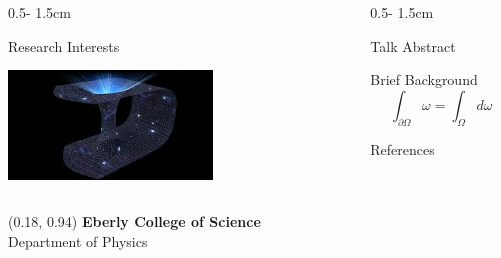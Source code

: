 \documentclass{psuposter}
\begin{document}
\begin{frame}
\begin{columns}[onlytextwidth]
\begin{column}{0.5\textwidth - 1.5cm}
    \begin{block}{Research Interests}
        \lipsum[2]
        \begin{center}
	    	\includegraphics[width=0.6\textwidth]{psuposter-images/sample-research}    		
    	\end{center}
    \end{block}
\end{column}


\begin{column}{0.5\textwidth - 1.5cm}
    \begin{block}{Talk Abstract}
        \lipsum[4]
    \end{block}

    \begin{block}{Brief Background}
        \lipsum[2]
        \cite{ashtekarLoopQuantumGravity2017}
        $$\int_{\partial \Omega} \omega = \int_{\Omega} d \omega$$
        \lipsum[2]
        \cite{anselmiPredictionsQuantumGravity2020}
    \end{block}

    \begin{block}{References}
        
		
    \end{block}

\end{column}


\end{columns}


\begin{textblock}{0.5}(0.18, 0.94)
    \color{white}
    \sffamily
    \textbf{Eberly College of Science}
    \\
    Department of Physics
    
\end{textblock}


\end{frame}
\end{document}
